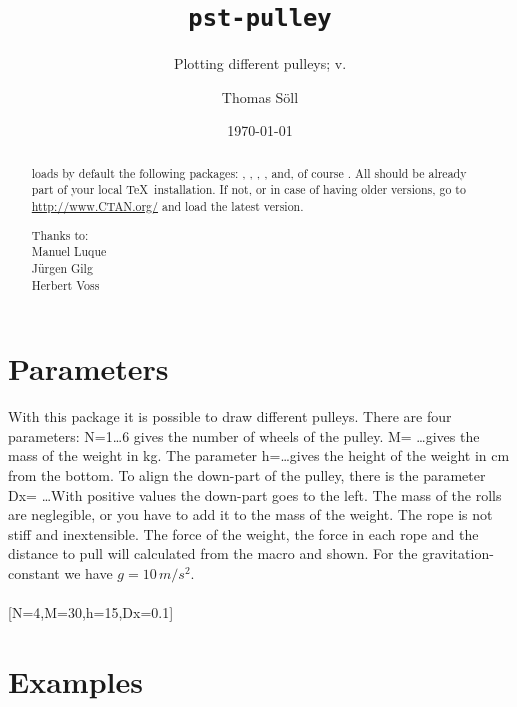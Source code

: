 \documentclass[11pt,english,BCOR10mm,DIV12,bibliography=totoc,parskip=false,
   smallheadings, headexclude,footexclude,oneside]{pst-doc}
\let\pstPulleyFV\fileversion
\begin{document}
\title{\texttt{pst-pulley}}
\subtitle{Plotting different pulleys; v.\pstPulleyFV}
\author{Thomas Söll}
\docauthor{}
\date{\today}
\maketitle

\tableofcontents
{}

\clearpage

\begin{abstract}
\noindent
{} loads by default the following packages: ,
, , , and, of course .
All should be already part of your local \TeX\ installation. If not, or in case
of having older versions, go to \url{http://www.CTAN.org/} and load the latest version.



\vfill\noindent
Thanks to: \\
Manuel Luque \\
Jürgen Gilg \\
Herbert Voss


\end{abstract}

\clearpage
\section{Parameters}

With this package it is possible to draw different pulleys. There are four parameters: N=1\ldots 6 gives the number of wheels of the pulley. M= \ldots gives the mass of the weight in kg. The parameter h=\ldots gives the height of the weight in cm from the bottom. To align the down-part of the pulley, there is the parameter Dx= \ldots With positive values the down-part goes to the left. The mass of the rolls are neglegible, or you have to add it to the mass of the weight. The rope is not stiff and inextensible. The force of the weight, the force in each rope and the distance to pull will calculated from the macro and shown. For the gravitation-constant we have $g=10\, m/s^2$.\\[0.5cm]

\OptArgs\\[0.5cm]

[N=4,M=30,h=15,Dx=0.1]


\section{Examples}
\end{document}
